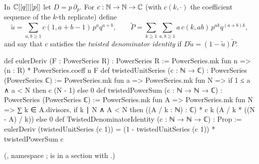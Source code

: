 \begin{definition}\label{ch19:def:twistedTD}
In ${\mathbb{C}}[[q]][[p]]$ let $D=p\,\partial_p$.  For $c:{\mathbb{N}}\to{\mathbb{N}}\to{\mathbb{C}}$ (with $c(k,\cdot)$ the coefficient sequence of the $k$-th
replicate) define
\begin{equation*}
  \tilde u=\sum_{a,b\ge1}c(1,a+b-1)\,p^aq^{a+b},\qquad
  \tilde P=\sum_{k\ge1}\sum_{a,b\ge1}a\,c(k,ab)\,p^{ak}q^{(a+b)k},
\end{equation*}
and say that $c$ satisfies the \emph{twisted denominator identity} if $D\tilde u=(1-\tilde u)\tilde P$.
\end{definition}
\begin{leancode}
def eulerDeriv (F : PowerSeries R) : PowerSeries R :=
  PowerSeries.mk fun n => (n : R) * PowerSeries.coeff n F
def twistedUnitSeries (c : ℕ → ℂ) : PowerSeries (PowerSeries ℂ) :=
  PowerSeries.mk fun a => PowerSeries.mk fun N => if 1 ≤ a ∧ a < N then c (N - 1) else 0
def twistedPowerSum (c : ℕ → ℕ → ℂ) : PowerSeries (PowerSeries ℂ) :=
  PowerSeries.mk fun A => PowerSeries.mk fun N =>
    ∑ k ∈ A.divisors,
      if k ∣ N ∧ A < N then ((A / k : ℕ) : ℂ) * c k (A / k * ((N - A) / k)) else 0
def TwistedDenominatorIdentity (c : ℕ → ℕ → ℂ) : Prop :=
  eulerDeriv (twistedUnitSeries (c 1)) = (1 - twistedUnitSeries (c 1)) * twistedPowerSum c
\end{leancode}
(, namespace ; 
is in a section with .)
